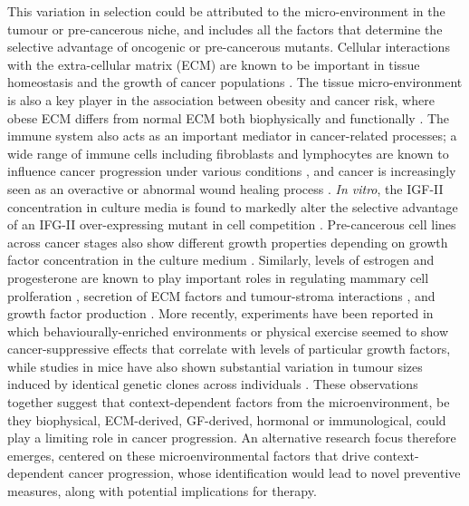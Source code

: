 \documentclass[12pt,onecolumn,twoside]{article}
\begin{document}
This variation in selection could be attributed to the micro-environment in the tumour or pre-cancerous niche, and includes all the factors that determine the selective advantage of oncogenic or pre-cancerous mutants. Cellular interactions with the extra-cellular matrix (ECM) are known to be important in tissue homeostasis \autocite{Hansen2000} and the growth of cancer populations \autocite{Pietras2010}. The tissue micro-environment is also a key player in the association between obesity and cancer risk, where obese ECM differs from normal ECM both biophysically \autocite{Druso2018} and functionally \autocite{Iyengar2016}. The immune system also acts as an important mediator in cancer-related processes; a wide range of immune cells including fibroblasts and lymphocytes are known to influence cancer progression under various conditions \autocite{Hanahan2012}, and cancer is increasingly seen as an overactive or abnormal wound healing process \autocite{Schafer2008}. \textit{In vitro}, the IGF-II concentration in culture media is found to markedly alter the selective advantage of an IFG-II over-expressing mutant in cell competition \autocite{Archetti2015}. Pre-cancerous cell lines across cancer stages also show different growth properties depending on growth factor concentration in the culture medium \autocite{Chan2014}. Similarly, levels of estrogen and progesterone are known to play important roles in regulating mammary cell prolferation \autocite{Haslam2001}, secretion of ECM factors and tumour-stroma interactions \autocite{Woodward2000}, and growth factor production \autocite{DICKSON1987}. More recently, experiments have been reported in which behaviourally-enriched environments or physical exercise seemed to show cancer-suppressive effects \autocite{Cao2010,Rundqvist2013} that correlate with levels of particular growth factors, while studies in mice have also shown substantial variation in tumour sizes induced by identical genetic clones across individuals \autocite{Rogers2017}. These observations together suggest that context-dependent factors from the microenvironment, be they biophysical, ECM-derived, GF-derived, hormonal or immunological, could play a limiting role in cancer progression. An alternative research focus therefore emerges, centered on these microenvironmental factors that drive context-dependent cancer progression, whose identification would lead to novel preventive measures, along with potential implications for therapy.
\end{document}
